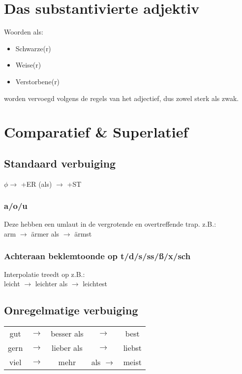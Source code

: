\documentclass[main.tex]{subfiles}
\begin{document}
\section{Das substantivierte adjektiv}

Woorden als:
\begin{itemize}
\item Schwarze(r)
\item Weise(r)
\item Verstorbene(r)
\end{itemize}

worden vervoegd volgens de regels van het adjectief, dus zowel sterk als zwak.

\section{Comparatief \& Superlatief}

\subsection{Standaard verbuiging}

$\phi \rightarrow$ +ER (als) $\rightarrow$ +ST

\subsubsection{a/o/u}
Deze hebben een umlaut in de vergrotende en overtreffende trap. z.B.:\\
arm $\rightarrow$ ärmer als $\rightarrow$ ärmst

\subsubsection{Achteraan beklemtoonde op t/d/s/ss/ß/x/sch}

Interpolatie treedt op z.B.:\\
leicht $\rightarrow$ leichter als $\rightarrow$ leichtest

\subsection{Onregelmatige verbuiging}

\begin{tabular}{ccccc}
gut & $\rightarrow$ & besser als & $\rightarrow$ & best \\ 
gern & $\rightarrow$ & lieber als & $\rightarrow$ & liebst \\ 
viel & $\rightarrow$ & mehr & als $\rightarrow$ & meist \\ 
\end{tabular} 
\end{document}
